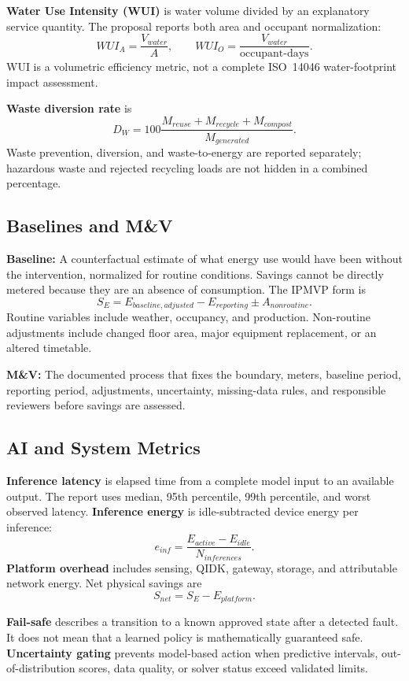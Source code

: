 \textbf{Water Use Intensity (WUI)} is water volume divided by an explanatory service quantity. The proposal reports both area and occupant normalization:
\begin{equation}
	WUI_A=\frac{V_{water}}{A},\qquad WUI_O=\frac{V_{water}}{\text{occupant-days}}.
\end{equation}
WUI is a volumetric efficiency metric, not a complete ISO~14046 water-footprint impact assessment.

\textbf{Waste diversion rate} is
\begin{equation}
	D_W=100\frac{M_{reuse}+M_{recycle}+M_{compost}}{M_{generated}}.
\end{equation}
Waste prevention, diversion, and waste-to-energy are reported separately; hazardous waste and rejected recycling loads are not hidden in a combined percentage.

\subsection{Baselines and M\&V}

\textbf{Baseline:} A counterfactual estimate of what energy use would have been without the intervention, normalized for routine conditions. Savings cannot be directly metered because they are an absence of consumption. The IPMVP form is~\cite{ipmvp2022}
\begin{equation}
	S_E=E_{baseline,adjusted}-E_{reporting}\pm A_{nonroutine}.
	\label{eq:savings}
\end{equation}
Routine variables include weather, occupancy, and production. Non-routine adjustments include changed floor area, major equipment replacement, or an altered timetable.

\textbf{M\&V:} The documented process that fixes the boundary, meters, baseline period, reporting period, adjustments, uncertainty, missing-data rules, and responsible reviewers before savings are assessed.

\subsection{AI and System Metrics}

\textbf{Inference latency} is elapsed time from a complete model input to an available output. The report uses median, 95th percentile, 99th percentile, and worst observed latency. \textbf{Inference energy} is idle-subtracted device energy per inference:
\begin{equation}
	e_{inf}=\frac{E_{active}-E_{idle}}{N_{inferences}}.
	\label{eq:inference-energy}
\end{equation}
\textbf{Platform overhead} includes sensing, QIDK, gateway, storage, and attributable network energy. Net physical savings are
\begin{equation}
	S_{net}=S_E-E_{platform}.
	\label{eq:net-savings}
\end{equation}

\textbf{Fail-safe} describes a transition to a known approved state after a detected fault. It does not mean that a learned policy is mathematically guaranteed safe. \textbf{Uncertainty gating} prevents model-based action when predictive intervals, out-of-distribution scores, data quality, or solver status exceed validated limits.
